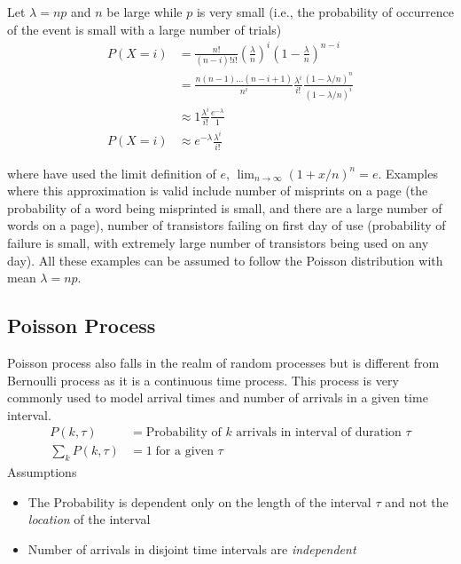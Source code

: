 \documentclass[../../probability-notes.tex]{subfiles}
\begin{document}
    Let $\lambda = np$ and $n$ be large while $p$ is very small (i.e., the probability of occurrence of the event is small with a large number of trials)
    \begin{align*}
        P(X = i) &= \frac{n!}{(n-i)!i!} (\frac{\lambda}{n})^{i} (1-\frac{\lambda}{n})^{n-i}\\
        &= \frac{n(n-1) \ldots (n-i + 1)}{n^{i}} \frac{\lambda^{i}}{i!} \frac{(1-\lambda / n)^{n}}{(1 - \lambda / n)^{i}}\\
        &\approx 1 \frac{\lambda^{i}}{i!} \frac{e^{-\lambda}}{1}\\
        P(X = i) &\approx e^{-\lambda}\frac{\lambda^{i}}{i!}
    \end{align*}

    where have used the limit definition of $e$, $\lim_{n \to \infty}(1 + x/n)^{n} = e$. Examples where this approximation is valid include number of misprints on a page (the probability of a word being misprinted is small, and there are a large number of words on a page), number of transistors failing on first day of use (probability of failure is small, with extremely large number of transistors being used on any day). All these examples can be assumed to follow the Poisson distribution with mean $\lambda = np$.


    \subsection{Poisson Process}
    Poisson process also falls in the realm of random processes but is different from Bernoulli process as it is a continuous time process. This process is very commonly used to model arrival times and number of arrivals in a given time interval.
    \begin{align*}
        P(k, \tau) &= \text{Probability of $k$ arrivals in interval of duration $\tau$}\\
        \sum_{k} P(k, \tau) &= 1 \; \text{for a given $\tau$}
    \end{align*}
    Assumptions
    \begin{itemize}
        \item The Probability is dependent only on the length of the interval $\tau$ and not the \emph{location} of the interval
        \item Number of arrivals in disjoint time intervals are \emph{independent}
    \end{itemize}
\end{document}
